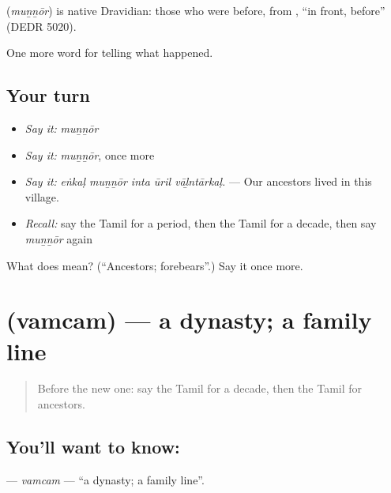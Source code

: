 \begin{cousinweb}
\textbf{} (\emph{muṉṉōr}) is native Dravidian: those who were before, from , \textquotedblleft{}in front, before\textquotedblright{} (DEDR 5020).
\end{cousinweb}

\begin{grammarlens}[title={What you've built}]
One more word for telling what happened.
\end{grammarlens}

\subsection*{Your turn}
\begin{itemize}
\raggedright
  \item \emph{Say it:} \emph{muṉṉōr}
  \item \emph{Say it:} \emph{muṉṉōr}, once more
  \item \emph{Say it:} \emph{eṅkaḷ muṉṉōr inta ūril vāḻntārkaḷ.} — Our ancestors lived in this village.
  \item \emph{Recall:} say the Tamil for a period, then the Tamil for a decade, then say \emph{muṉṉōr} again
\end{itemize}

\begin{tcolorbox}[breakable,colback=teal!4,colframe=teal!35!black,title={Before you move on}]
What does  mean? (\textquotedblleft{}Ancestors; forebears\textquotedblright{}.) Say it once more.
\end{tcolorbox}
\section[\texorpdfstring{\ta{வம்சம்} (vamcam)}{வம்சம் (vamcam)}]{ (vamcam) — a dynasty; a family line}

\label{lesson:TA-C327-vamcam}



\begin{quote}
Before the new one: say the Tamil for a decade, then the Tamil for ancestors.
\end{quote}

\subsection*{You'll want to know: }
\textbf{} — \emph{vamcam} — \textquotedblleft{}a dynasty; a family line\textquotedblright{}.

